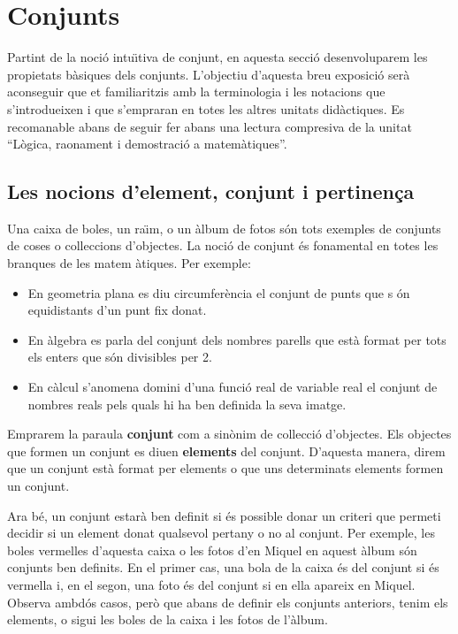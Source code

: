 

\section{Conjunts}

Partint de la noci\'{o} intu\"{\i}tiva de conjunt, en aquesta secci\'{o}
desenvoluparem les propietats b\`{a}siques dels conjunts. L'objectiu
d'aquesta breu exposici\'{o} ser\`{a} aconseguir que et familiaritzis amb la
terminologia i les notacions que s'introdueixen i que s'empraran en totes
les altres unitats did\`{a}ctiques. Es recomanable abans de seguir fer abans
una lectura compresiva de la unitat \textquotedblleft L\`{o}gica, raonament
i demostraci\'{o} a matem\`{a}tiques\textquotedblright.

\subsection{Les nocions d'element, conjunt i pertinen\c{c}a}

Una caixa de boles, un ra\"{\i}m, o un \`{a}lbum de fotos s\'{o}n tots
exemples de conjunts de coses o col\textperiodcentered leccions d'objectes.
La noci\'{o} de conjunt \'{e}s fonamental en totes les branques de les matem%
\`{a}tiques. Per exemple:

\begin{itemize}
\item En geometria plana es diu circumfer\`{e}ncia el conjunt de punts que s%
\'{o}n equidistants d'un punt fix donat.

\item En \`{a}lgebra es parla del conjunt dels nombres parells que est\`{a}
format per tots els enters que s\'{o}n divisibles per 2.

\item En c\`{a}lcul s'anomena domini d'una funci\'{o} real de variable real
el conjunt de nombres reals pels quals hi ha ben definida la seva imatge.
\end{itemize}

Emprarem la paraula \textbf{conjunt} com a sin\`{o}nim de
col\textperiodcentered lecci\'{o} d'objectes. Els objectes que formen un
conjunt es diuen \textbf{elements} del conjunt. D'aquesta manera, direm que
un conjunt est\`{a} format per elements o que uns determinats elements
formen un conjunt.

\bigskip

Ara b\'{e}, un conjunt estar\`{a} ben definit si \'{e}s possible donar un
criteri que permeti decidir si un element donat qualsevol pertany o no al
conjunt. Per exemple, les boles vermelles d'aquesta caixa o les fotos d'en
Miquel en aquest \`{a}lbum s\'{o}n conjunts ben definits. En el primer cas,
una bola de la caixa \'{e}s del conjunt si \'{e}s vermella i, en el segon,
una foto \'{e}s del conjunt si en ella apareix en Miquel. Observa ambd\'{o}s
casos, per\`{o} que abans de definir els conjunts anteriors, tenim els
elements, o sigui les boles de la caixa i les fotos de l'\`{a}lbum.

